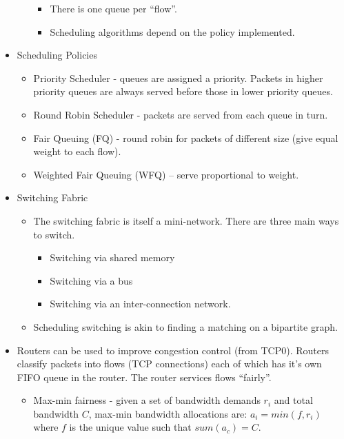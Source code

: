 \begin{itemize}
\begin{itemize}
    \begin{itemize}
    \tightlist
    \item
      There is one queue per ``flow''.
    \item
      Scheduling algorithms depend on the policy implemented.
    \end{itemize}
  \end{itemize}
\item
  Scheduling Policies

  \begin{itemize}
  \tightlist
  \item
    Priority Scheduler - queues are assigned a priority. Packets in
    higher priority queues are always served before those in lower
    priority queues.
  \item
    Round Robin Scheduler - packets are served from each queue in turn.
  \item
    Fair Queuing (FQ) - round robin for packets of different size (give
    equal weight to each flow).
  \item
    Weighted Fair Queuing (WFQ) -- serve proportional to weight.
  \end{itemize}
\item
  Switching Fabric

  \begin{itemize}
  \tightlist
  \item
    The switching fabric is itself a mini-network. There are three main
    ways to switch.

    \begin{itemize}
    \tightlist
    \item
      Switching via shared memory
    \item
      Switching via a bus
    \item
      Switching via an inter-connection network.
    \end{itemize}
  \item
    Scheduling switching is akin to finding a matching on a bipartite
    graph.
  \end{itemize}
\item
  Routers can be used to improve congestion control (from TCP0). Routers
  classify packets into flows (TCP connections) each of which has it's
  own FIFO queue in the router. The router services flows ``fairly''.

  \begin{itemize}
  \tightlist
  \item
    Max-min fairness - given a set of bandwidth demands \(r_i\) and
    total bandwidth \(C\), max-min bandwidth allocations are:
    \(a_i = min(f, r_i)\) where \(f\) is the unique value such that
    \(sum(a_c) = C\).
  \end{itemize}


\end{itemize}

